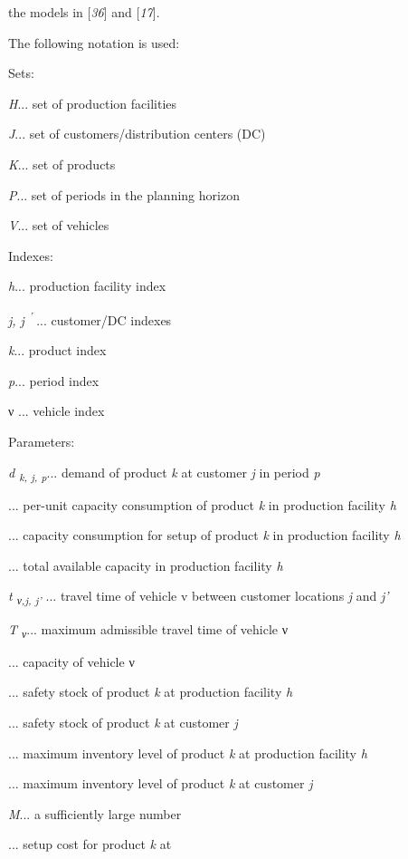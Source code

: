  the models in [\textit{36}] and [\textit{17}].\par The following notation is used:\par Sets:\par \textit{H}... set of production facilities\par \textit{J}... set of customers/distribution centers (DC)\par \textit{K}... set of products\par \textit{P}... set of periods in the planning horizon\par \textit{V}... set of vehicles\par Indexes:\par \textit{h}... production facility index\par \textit{j, j \textsuperscript{' }}... customer/DC indexes\par \textit{k}... product index\par \textit{p}... period index\par ν ... vehicle index\par Parameters:\par \textit{d \textsubscript{k, j, p}}... demand of product \textit{k} at
 customer \textit{j} in period \textit{p}\par  ... per-unit capacity consumption of product
 \textit{k} in production facility \textit{h}\par  ... capacity consumption for setup of product
 \textit{k} in production facility \textit{h}\par  ... total available capacity in production facility
 \textit{h}\par \textit{t \textsubscript{ν,j, j' }}... travel time of vehicle v between customer
 locations \textit{j} and \textit{j'}\par \textit{T \textsubscript{ν}}... maximum admissible travel time of vehicle ν\par  ... capacity of vehicle ν\par  ... safety stock of product \textit{k} at
 production facility \textit{h}\par  ... safety stock of product \textit{k} at
 customer \textit{j}\par  ... maximum inventory level of product \textit{k
 } at production facility \textit{h}\par  ... maximum inventory level of product \textit{k
 } at customer \textit{j}\par \textit{M}... a sufficiently large number\par  ... setup cost for product \textit{k} at
